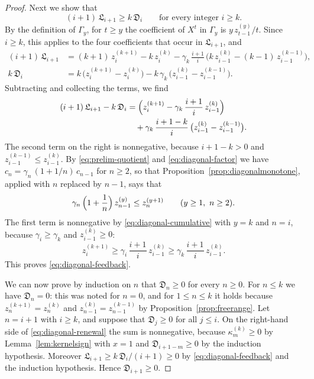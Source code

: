 \documentclass{amsart}
\theoremstyle{definition}
\theoremstyle{remark}
\numberwithin{equation}{section}
\begin{document}
\begin{proof}
Next we show that
\begin{equation}\label{eq:diagonal-feedback}
(i+1)\,\mathfrak L_{i+1}\ge k\,\mathfrak D_i
\qquad\text{for every integer }i\ge k .
\end{equation}
By the definition of $\Gamma_y$, for $t\ge y$ the coefficient of $X^t$ in
$\Gamma_y$ is $y\,z^{(y)}_{t-1}/t$. Since $i\ge k$, this applies to the four
coefficients that occur in $\mathfrak L_{i+1}$, and
\begin{align*}
(i+1)\,\mathfrak L_{i+1}
&=(k+1)\,z^{(k+1)}_i-k\,z^{(k)}_i
-\gamma_k\,\frac{i+1}{i}\,\bigl(k\,z^{(k)}_{i-1}-(k-1)\,z^{(k-1)}_{i-1}\bigr),\\
k\,\mathfrak D_i
&=k\,\bigl(z^{(k+1)}_i-z^{(k)}_i\bigr)
-k\,\gamma_k\,\bigl(z^{(k)}_{i-1}-z^{(k-1)}_{i-1}\bigr).
\end{align*}
Subtracting and collecting the terms, we find
\begin{align*}
(i+1)\,\mathfrak L_{i+1}-k\,\mathfrak D_i
&=\Bigl(z^{(k+1)}_i-\gamma_k\,\frac{i+1}{i}\,z^{(k)}_{i-1}\Bigr)\\
&\quad+\gamma_k\,\frac{i+1-k}{i}\,\bigl(z^{(k)}_{i-1}-z^{(k-1)}_{i-1}\bigr).
\end{align*}
The second term on the right is nonnegative, because $i+1-k>0$ and
$z^{(k-1)}_{i-1}\le z^{(k)}_{i-1}$. By \eqref{eq:prelim-quotient} and
\eqref{eq:diagonal-factor} we have $c_n=\gamma_n\,(1+1/n)\,c_{n-1}$ for
$n\ge2$, so that Proposition~\ref{prop:diagonalmonotone}, applied with $n$
replaced by $n-1$, says that
\begin{equation}\label{eq:diagonal-cumulative}
\gamma_n\,\Bigl(1+\frac1n\Bigr)\,z^{(y)}_{n-1}\le z^{(y+1)}_n
\qquad(y\ge1,\ n\ge2).
\end{equation}
The first term is nonnegative by
\eqref{eq:diagonal-cumulative} with $y=k$ and $n=i$, because
$\gamma_i\ge\gamma_k$ and $z^{(k)}_{i-1}\ge0$:
\[
z^{(k+1)}_i\ge\gamma_i\,\frac{i+1}{i}\,z^{(k)}_{i-1}
\ge\gamma_k\,\frac{i+1}{i}\,z^{(k)}_{i-1}.
\]
This proves \eqref{eq:diagonal-feedback}.

We can now prove by induction on $n$ that $\mathfrak D_n\ge0$ for every
$n\ge0$. For $n\le k$ we have $\mathfrak D_n=0$: this was noted for $n=0$,
and for $1\le n\le k$ it holds because $z^{(k+1)}_n=z^{(k)}_n$ and
$z^{(k)}_{n-1}=z^{(k-1)}_{n-1}$ by Proposition~\ref{prop:freerange}. Let
$n=i+1$ with $i\ge k$, and suppose that $\mathfrak D_j\ge0$ for all
$j\le i$. On the right-hand side of \eqref{eq:diagonal-renewal} the sum is
nonnegative, because $\kappa^{(k)}_m\ge0$ by Lemma~\ref{lem:kernelsign} with
$x=1$ and $\mathfrak D_{i+1-m}\ge0$ by the induction hypothesis. Moreover
$\mathfrak L_{i+1}\ge k\,\mathfrak D_i/(i+1)\ge0$ by
\eqref{eq:diagonal-feedback} and the induction hypothesis. Hence
$\mathfrak D_{i+1}\ge0$.
\end{proof}
\end{document}
